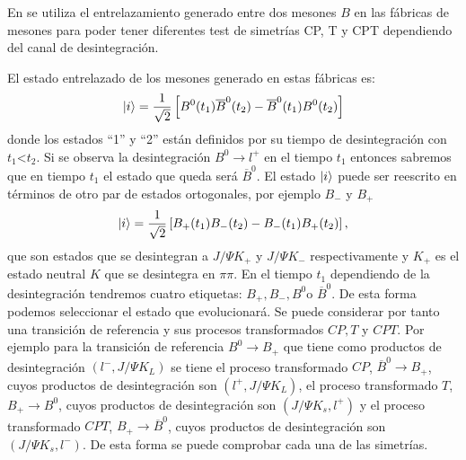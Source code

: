 \documentclass{article}
\theoremstyle{plain}
\theoremstyle{definition}
\begin{document}
	En \cite{Bernabeu:2011te} se utiliza el entrelazamiento generado entre dos mesones \(B\)  en las fábricas de mesones para poder tener diferentes test de simetrías CP, T y CPT dependiendo del canal de desintegración. \par 
	El estado entrelazado de los mesones generado en estas fábricas es: \[\ket{i} = \frac{1}{\sqrt{2}}\left[B^0(t_1)\overline{B}^0(t_2) - \overline{B}^0(t_1)B^0(t_2) \right]\]
	donde los estados ``1'' y ``2'' están definidos por su tiempo de desintegración con \(t_1\)<\(t_2\). Si se observa la desintegración \(B^0\rightarrow l^+\) en el tiempo \(t_1\) entonces sabremos que en tiempo \(t_1\) el estado que queda será \(\overline{B}^0 \).
	El estado \(\ket{i} \) puede ser reescrito en términos de otro par de estados ortogonales, por ejemplo \(B_-\) y \(B_+\) 
	\[\ket{i} = \frac{1}{\sqrt{2}}\left[B_+(t_1)B_-(t_2) - B_-(t_1)B_+(t_2) \right] , \]
	que son estados que se desintegran a \(J/\Psi K_+\) y \(J/\Psi K_-\) respectivamente y \(K_+\) es el estado neutral \(K\) que se desintegra en \(\pi\pi \). En el tiempo \(t_1\) dependiendo de la desintegración tendremos cuatro etiquetas: \(B_+,B_-,B^0\)o \(\overline{B}^0\). De esta forma podemos seleccionar el estado que evolucionará.
	Se puede considerar por tanto una transición de referencia y sus procesos transformados \(CP, T\) y \(CPT\). Por ejemplo para la transición de referencia \(B^0\rightarrow B_+\) que tiene como productos de desintegración \((l^-,J/\Psi K_L)\) se tiene el proceso transformado \(CP\), \(\overline{B}^0\rightarrow B_+ \),  cuyos productos de desintegración son \((l^+,J/\Psi K_L)\), el proceso transformado \(T\), \(B_+\rightarrow B^0 \),  cuyos productos de desintegración son \((J/\Psi K_s,l^+)\) y el proceso transformado \(CPT\), \(B_+\rightarrow \overline{B}^0 \),  cuyos productos de desintegración son \((J/\Psi K_s,l^-)\). De esta forma se puede comprobar cada una de las simetrías.\par
\end{document}
